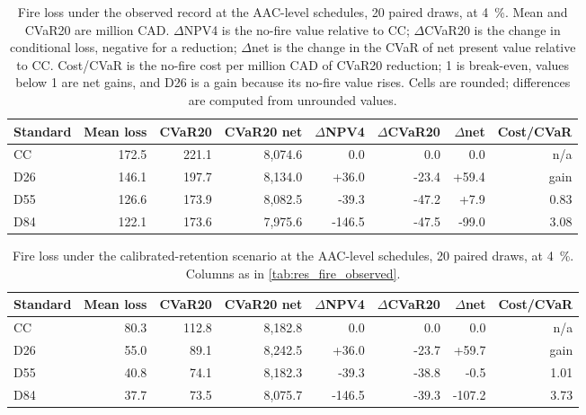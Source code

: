 \begin{table}[h]
    \centering
    \small
    \caption{Fire loss under the observed record at the AAC-level schedules, 20 paired draws, at
    \SI{4}{\percent}. Mean and CVaR20 are million CAD. $\Delta$NPV4 is the no-fire value relative to
    CC; $\Delta$CVaR20 is the change in conditional loss, negative for a reduction; $\Delta$net is
    the change in the CVaR of net present value relative to CC. Cost/CVaR is the no-fire cost per
    million CAD of CVaR20 reduction; 1 is break-even, values below 1 are net gains, and D26 is a gain because
    its no-fire value rises. Cells are rounded; differences are computed from unrounded values.}
    \label{tab:res_fire_observed}
    \begin{tabular}{lrrrrrrr}
        \toprule
        Standard & Mean loss & CVaR20 & CVaR20 net & $\Delta$NPV4 & $\Delta$CVaR20 & $\Delta$net & Cost/CVaR \\
        \midrule
        CC  & 172.5 & 221.1 & 8,074.6 & 0.0 & 0.0 & 0.0 & n/a \\
        D26 & 146.1 & 197.7 & 8,134.0 & +36.0 & -23.4 & +59.4 & gain \\
        D55 & 126.6 & 173.9 & 8,082.5 & -39.3 & -47.2 & +7.9 & 0.83 \\
        D84 & 122.1 & 173.6 & 7,975.6 & -146.5 & -47.5 & -99.0 & 3.08 \\
        \bottomrule
    \end{tabular}
\end{table}

\begin{table}[h]
    \centering
    \small
    \caption{Fire loss under the calibrated-retention scenario at the AAC-level schedules, 20 paired
    draws, at \SI{4}{\percent}. Columns as in \autoref{tab:res_fire_observed}.}
    \label{tab:res_fire_calibrated}
    \begin{tabular}{lrrrrrrr}
        \toprule
        Standard & Mean loss & CVaR20 & CVaR20 net & $\Delta$NPV4 & $\Delta$CVaR20 & $\Delta$net & Cost/CVaR \\
        \midrule
        CC  & 80.3 & 112.8 & 8,182.8 & 0.0 & 0.0 & 0.0 & n/a \\
        D26 & 55.0 & 89.1 & 8,242.5 & +36.0 & -23.7 & +59.7 & gain \\
        D55 & 40.8 & 74.1 & 8,182.3 & -39.3 & -38.8 & -0.5 & 1.01 \\
        D84 & 37.7 & 73.5 & 8,075.7 & -146.5 & -39.3 & -107.2 & 3.73 \\
        \bottomrule
    \end{tabular}
\end{table}

